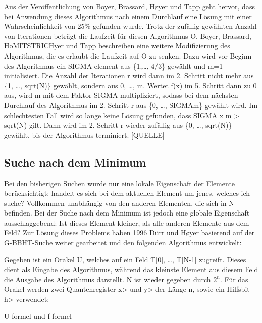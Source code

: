 Aus der Veröffentlichung von Boyer, Brassard, Høyer und Tapp geht hervor, dass bei Anwendung dieses Algorithmus nach einem Durchlauf eine Lösung mit einer Wahrscheinlichkeit von 25\% gefunden wurde. Trotz der zufällig gewählten Anzahl von Iterationen beträgt die Laufzeit für diesen Algorithmus O.
Boyer, Brassard, HoMITSTRICHyer und Tapp beschreiben eine weitere Modifizierung des Algorithmus, die es erlaubt die Laufzeit auf O zu senken. 
Dazu wird vor Beginn des Algorithmus ein SIGMA element aus \{1,…, 4/3\} gewählt und m=1 initialisiert. Die Anzahl der Iterationen r wird dann im 2. Schritt nicht mehr aus \{1, …, sqrt(N)\} gewählt, sondern aus {0, …, m}. Wertet f(x) im 5. Schritt dann zu 0 aus, wird m mit dem Faktor SIGMA multipliziert, sodass bei dem nächsten Durchlauf des Algorithmus im 2. Schritt r aus \{0, …, SIGMAm\} gewählt wird. Im schlechtesten Fall wird so lange keine Lösung gefunden, dass SIGMA x m > sqrt(N) gilt. Dann wird im 2. Schritt r wieder zufällig aus \{0,  …, sqrt(N)\} gewählt, bis der Algorithmus terminiert. [QUELLE]


\subsection{Suche nach dem Minimum}
Bei den bisherigen Suchen wurde nur eine lokale Eigenschaft der Elemente berücksichtigt: handelt es sich bei dem aktuellen Element um jenes, welches ich suche? Vollkommen unabhängig von den anderen Elementen, die sich in N befinden. Bei der Suche nach dem Minimum ist jedoch eine globale Eigenschaft ausschlaggebend: Ist dieses Element kleiner, als alle anderen Elemente aus dem Feld? 
Zur Lösung dieses Problems haben 1996 Dürr und Høyer basierend auf der G-BBHT-Suche weiter gearbeitet und den folgenden Algorithmus entwickelt: 

Gegeben ist ein Orakel U, welches auf ein Feld T[0], …, T[N-1] zugreift. Dieses dient als Eingabe des Algorithmus, während das kleinste Element aus diesem Feld die Ausgabe des Algorithmus darstellt. N ist wieder gegeben durch $2^n$. Für das Orakel werden zwei Quantenregister x> und y> der Länge n, sowie ein Hilfsbit h> verwendet:

U formel und f formel


